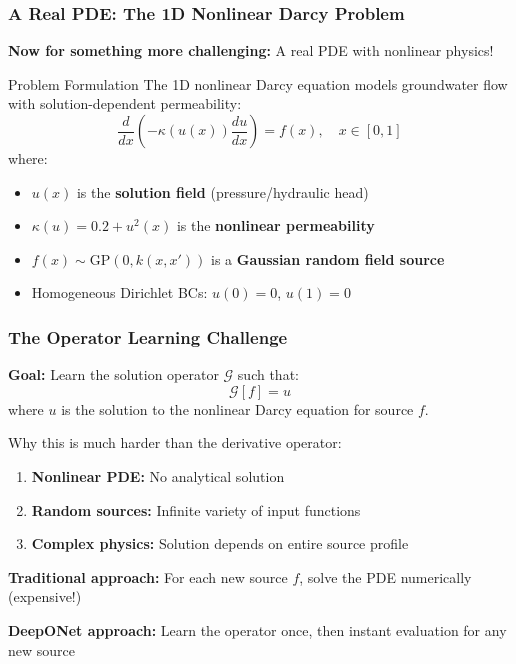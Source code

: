\documentclass[notes]{beamer}
\begin{document}
\begin{frame}
\frametitle{A Real PDE: The 1D Nonlinear Darcy Problem}

\textbf{Now for something more challenging:} A real PDE with nonlinear physics!

\begin{block}{Problem Formulation}
The 1D nonlinear Darcy equation models groundwater flow with solution-dependent permeability:
\begin{equation*}
\frac{d}{dx}\left(-\kappa(u(x))\frac{du}{dx}\right) = f(x), \quad x \in [0,1]
\end{equation*}
where:
\begin{itemize}
    \item $u(x)$ is the \textbf{solution field} (pressure/hydraulic head)
    \item $\kappa(u) = 0.2 + u^2(x)$ is the \textbf{nonlinear permeability}
    \item $f(x) \sim \text{GP}(0, k(x, x'))$ is a \textbf{Gaussian random field source}
    \item Homogeneous Dirichlet BCs: $u(0) = 0$, $u(1) = 0$
\end{itemize}
\end{block}

\end{frame}

\begin{frame}
\frametitle{The Operator Learning Challenge}

\textbf{Goal:} Learn the solution operator $\mathcal{G}$ such that:
\begin{equation*}
\mathcal{G}[f] = u
\end{equation*}
where $u$ is the solution to the nonlinear Darcy equation for source $f$.

\vspace{1cm}

\begin{alertblock}{Why this is much harder than the derivative operator:}
\begin{enumerate}
    \item \textbf{Nonlinear PDE:} No analytical solution
    \item \textbf{Random sources:} Infinite variety of input functions  
    \item \textbf{Complex physics:} Solution depends on entire source profile
\end{enumerate}
\end{alertblock}

\vspace{0.5cm}

\textbf{Traditional approach:} For each new source $f$, solve the PDE numerically (expensive!)

\textbf{DeepONet approach:} Learn the operator once, then instant evaluation for any new source

\end{frame}
\end{document}
